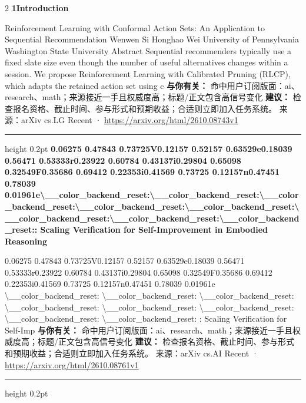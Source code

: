 \documentclass[10.5pt]{ctexart}
\begin{document}
\begin{multicols}{2}
{\large\bfseries 1Introduction}\par
Reinforcement Learning with Conformal Action Sets: An Application to Sequential Recommendation Wenwen Si Honghao Wei University of Pennsylvania Washington State University Abstract Sequential recommenders typically use a fixed slate size even though the number of useful alternatives changes within a session. We propose Reinforcement Learning with Calibrated Pruning (RLCP), which adapts the retained action set using c
\textbf{与你有关：} 命中用户订阅版面：ai、research、math；来源接近一手且权威度高；标题/正文包含高信号变化
\textbf{建议：} 检查报名资格、截止时间、参与形式和预期收益；合适则立即加入任务系统。
{\footnotesize\color{ormuted} 来源：arXiv cs.LG Recent · \url{https://arxiv.org/html/2610.08743v1}}
\vspace{2mm}
\hrule height 0.2pt
\vspace{2mm}
{\large\bfseries 0.06275 0.47843 0.73725V0.12157 0.52157 0.63529e0.18039 0.56471 0.53333r0.23922 0.60784 0.43137i0.29804 0.65098 0.32549F0.35686 0.69412 0.22353i0.41569 0.73725 0.12157n0.47451 0.78039 0.01961e\textbackslash{}\_\_color\_backend\_reset:\textbackslash{}\_\_color\_backend\_reset:\textbackslash{}\_\_color\_backend\_reset:\textbackslash{}\_\_color\_backend\_reset:\textbackslash{}\_\_color\_backend\_reset:\textbackslash{}\_\_color\_backend\_reset:\textbackslash{}\_\_color\_backend\_reset:\textbackslash{}\_\_color\_backend\_reset:: Scaling Verification for Self-Improvement in Embodied Reasoning}\par
0.06275 0.47843 0.73725V0.12157 0.52157 0.63529e0.18039 0.56471 0.53333r0.23922 0.60784 0.43137i0.29804 0.65098 0.32549F0.35686 0.69412 0.22353i0.41569 0.73725 0.12157n0.47451 0.78039 0.01961e \textbackslash{}\_\_color\_backend\_reset: \textbackslash{}\_\_color\_backend\_reset: \textbackslash{}\_\_color\_backend\_reset: \textbackslash{}\_\_color\_backend\_reset: \textbackslash{}\_\_color\_backend\_reset: \textbackslash{}\_\_color\_backend\_reset: \textbackslash{}\_\_color\_backend\_reset: \textbackslash{}\_\_color\_backend\_reset: : Scaling Verification for Self-Imp
\textbf{与你有关：} 命中用户订阅版面：ai、research、math；来源接近一手且权威度高；标题/正文包含高信号变化
\textbf{建议：} 检查报名资格、截止时间、参与形式和预期收益；合适则立即加入任务系统。
{\footnotesize\color{ormuted} 来源：arXiv cs.AI Recent · \url{https://arxiv.org/html/2610.08761v1}}
\vspace{2mm}
\hrule height 0.2pt
\vspace{2mm}

\end{multicols}
\end{document}
